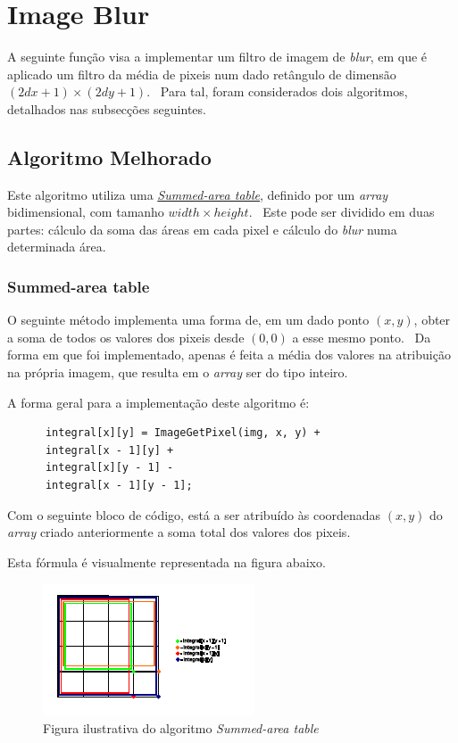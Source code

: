 
\section{Image Blur}\label{sec:imageblur}
    \par A seguinte função visa a implementar um filtro de imagem de \textit{blur}, em que é aplicado um filtro da média de pixeis num dado retângulo de dimensão $(2dx + 1) \times (2dy + 1)$. \ Para tal, foram considerados dois algoritmos, detalhados nas subsecções seguintes.

\subsection{Algoritmo Melhorado}\label{subsec:blur1}
    \par Este algoritmo utiliza uma \href{https://en.wikipedia.org/wiki/Summed-area_table}{\textit{Summed-area table}}, definido por um \textit{array} bidimensional, com tamanho $width \times height$. \ Este pode ser dividido em duas partes: cálculo da soma das áreas em cada pixel e cálculo do \textit{blur} numa determinada área.

\subsubsection{Summed-area table}
    \par O seguinte método implementa uma forma de, em um dado ponto $(x,y)$, obter a soma de todos os valores dos pixeis desde $(0,0)$ a esse mesmo ponto. \ Da forma em que foi implementado, apenas é feita a média dos valores na atribuição na própria imagem, que resulta em o \textit{array} ser do tipo inteiro.

    \par A forma geral para a implementação deste algoritmo é:

    \begin{lstlisting}
      integral[x][y] = ImageGetPixel(img, x, y) +
      integral[x - 1][y] +
      integral[x][y - 1] -
      integral[x - 1][y - 1];    
    \end{lstlisting}

    \par Com o seguinte bloco de código, está a ser atribuído às coordenadas $(x,y)$ do \textit{array} criado anteriormente a soma total dos valores dos pixeis.
    \par Esta fórmula é visualmente representada na figura abaixo.

    \begin{figure} [H]
        \centering
        \includegraphics[scale=3]{images/sumareas.pdf}
        \caption{Figura ilustrativa do algoritmo \textit{Summed-area table}} 
    \end{figure}

